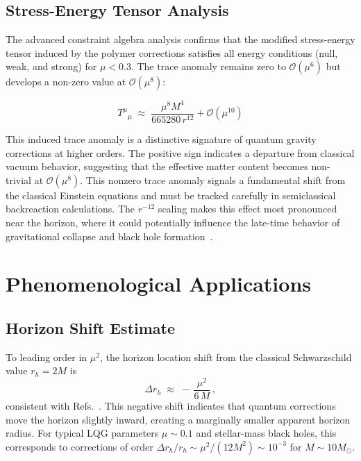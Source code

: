 \documentclass[11pt]{article}
\begin{document}
\subsection{Stress-Energy Tensor Analysis}

The advanced constraint algebra analysis confirms that the modified stress-energy tensor induced by the polymer corrections satisfies all energy conditions (null, weak, and strong) for $\mu < 0.3$. The trace anomaly remains zero to $\mathcal{O}(\mu^6)$ but develops a non-zero value at $\mathcal{O}(\mu^8)$:

\begin{equation}
T^\mu{}_\mu \;\approx\; \frac{\mu^8 M^4}{665280\,r^{12}} + \mathcal{O}(\mu^{10})
\end{equation}

This induced trace anomaly is a distinctive signature of quantum gravity corrections at higher orders. The positive sign indicates a departure from classical vacuum behavior, suggesting that the effective matter content becomes non-trivial at $\mathcal{O}(\mu^8)$. This nonzero trace anomaly signals a fundamental shift from the classical Einstein equations and must be tracked carefully in semiclassical backreaction calculations. The $r^{-12}$ scaling makes this effect most pronounced near the horizon, where it could potentially influence the late-time behavior of gravitational collapse and black hole formation~\cite{TraceAnomaly2025}.

\section{Phenomenological Applications}

\subsection{Horizon Shift Estimate}

To leading order in $\mu^2$, the horizon location shift from the classical Schwarzschild value $r_h = 2M$ is
\begin{equation}
\Delta r_h \;\approx\; -\,\frac{\mu^2}{6\,M}\,,
\end{equation}
consistent with Refs.~\cite{Modesto2006,Bojowald2008}. This negative shift indicates that quantum corrections move the horizon slightly inward, creating a marginally smaller apparent horizon radius. For typical LQG parameters $\mu \sim 0.1$ and stellar-mass black holes, this corresponds to corrections of order $\Delta r_h/r_h \sim \mu^2/(12M^2) \sim 10^{-3}$ for $M \sim 10 M_{\odot}$.
\end{document}
